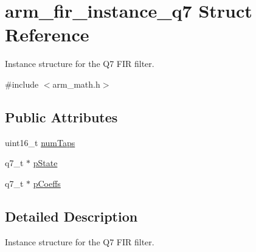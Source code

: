 \hypertarget{structarm__fir__instance__q7}{\section{arm\-\_\-fir\-\_\-instance\-\_\-q7 Struct Reference}
\label{structarm__fir__instance__q7}
}


Instance structure for the Q7 F\-I\-R filter.  




{\ttfamily \#include $<$arm\-\_\-math.\-h$>$}

\subsection*{Public Attributes}
\begin{DoxyCompactItemize}
\item 
uint16\-\_\-t \hyperlink{structarm__fir__instance__q7_a9b50840e2c5ef5b17e1a584fb4cf0d06}{num\-Taps}
\item 
q7\-\_\-t $\ast$ \hyperlink{structarm__fir__instance__q7_aaddea3b9c7e16ddfd9428b7bf9f9c200}{p\-State}
\item 
q7\-\_\-t $\ast$ \hyperlink{structarm__fir__instance__q7_a0e45aedefc3fffad6cb315c5b6e5bd49}{p\-Coeffs}
\end{DoxyCompactItemize}


\subsection{Detailed Description}
Instance structure for the Q7 F\-I\-R filter. 

